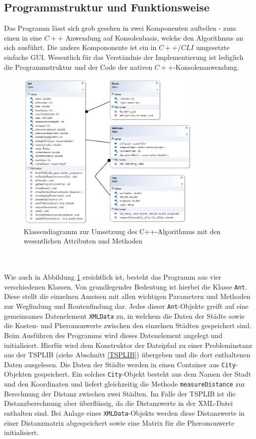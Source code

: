 \documentclass[doktyp=barbeit, sprache=german]{TUBAFarbeiten}
\begin{document}
\subsection{Programmstruktur und Funktionsweise}
\label{structure}
Das Programm lässt sich grob gesehen in zwei Komponenten aufteilen - zum einen in eine $C++$ Anwendung auf Konsolenbasis, welche den Algorithmus an sich ausführt. Die andere Kompononente ist ein in $C++/CLI$ umgesetzte einfache GUI. Wesentlich für das Verständnis der Implementierung ist lediglich die Programmstruktur und der Code der nativen $C++$-Konsolenanwendung. 
\begin{figure}
\captionsetup{justification=centering}
  \centering
     \includegraphics[width=0.8\textwidth]{images/classdiagram.png}
  \caption{Klassendiagramm zur Umsetzung des C++-Algorithmus mit den wesentlichen Attributen und Methoden}
  \label{img:classdiagram}
\end{figure}
\\\\Wie auch in Abbildung \ref{img:classdiagram} ersichtlich ist, besteht das Programm aus vier verschiedenen Klassen. Von grundlegender Bedeutung ist hierbei die Klasse \texttt{Ant}. Diese stellt die einzelnen Ameisen mit allen wichtigen Parametern und Methoden zur Wegfindung und Routenfindung dar. Jedes dieser \texttt{Ant}-Objekte greift auf eine gemeinsames Datenelement \texttt{XMLData} zu, in welchem die Daten der Städte sowie die Kosten- und Pheromonwerte zwischen den einzelnen Städten gespeichert sind. Beim Ausführen des Programms wird dieses Datenelement angelegt und initialisiert. Hierfür wird dem Konstruktor der Dateipfad zu einer Probleminstanz aus der TSPLIB (siehe Abschnitt \ref{TSPLIB}) übergeben und die dort enthaltenen Daten ausgelesen. Die Daten der Städte werden in einen Container aus \texttt{City}-Objekten gespeichert. Ein solches \texttt{City}-Objekt besteht aus dem Namen der Stadt und den Koordinaten und liefert gleichzeitig die Methode \texttt{measureDistance} zur Berechnung der Distanz zwischen zwei Städten. Im Falle der TSPLIB ist die Distanzberechnung aber überflüssig, da die Distanzwerte in der XML-Datei enthalten sind. Bei Anlage eines \texttt{XMLData}-Objekts werden diese Distanzwerte in einer Distanzmatrix abgespeichert sowie eine Matrix für die Pheromonwerte initialisiert. 
\end{document}
